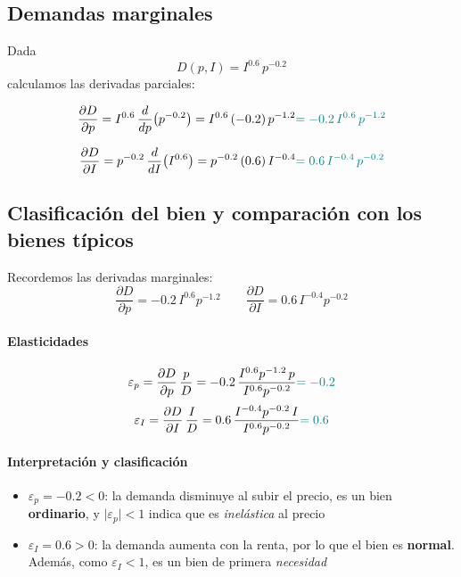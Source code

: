 \documentclass{article}
\begin{document}
\subsection*{Demandas marginales}

Dada
\[
D(p,I)=I^{0.6}\,p^{-0.2}
\]
calculamos las derivadas parciales:

\[
\frac{\partial D}{\partial p}
=I^{0.6}\,\frac{d}{dp}\bigl(p^{-0.2}\bigr)
=I^{0.6}\,(-0.2)\,p^{-1.2}
\color{teal}{= -0.2\,I^{0.6}\,p^{-1.2}}
\]

\[
\frac{\partial D}{\partial I}
=p^{-0.2}\,\frac{d}{dI}\bigl(I^{0.6}\bigr)
=p^{-0.2}\,(0.6)\,I^{-0.4}
\color{teal}{= 0.6\,I^{-0.4}\,p^{-0.2}}
\]

\subsection*{ Clasificación del bien y comparación con los bienes típicos}

Recordemos las derivadas marginales:
\[
\frac{\partial D}{\partial p}=-0.2\,I^{0.6}p^{-1.2}
\qquad
\frac{\partial D}{\partial I}=0.6\,I^{-0.4}p^{-0.2}
\]

\paragraph{Elasticidades}

\[
\varepsilon_{p}
=\frac{\partial D}{\partial p}\,\frac{p}{D}
=-0.2\,\frac{I^{0.6}p^{-1.2}\,p}{I^{0.6}p^{-0.2}}
\color{teal}{= -0.2}
\]
\[
\varepsilon_{I}
=\frac{\partial D}{\partial I}\,\frac{I}{D}
=0.6\,\frac{I^{-0.4}p^{-0.2}\,I}{I^{0.6}p^{-0.2}}
\color{teal}{= 0.6}
\]

\paragraph{Interpretación y clasificación}

\begin{itemize}
  \item \(\varepsilon_{p} = -0.2 < 0\): la demanda disminuye al subir el precio, es un bien \textbf{\color{teal} ordinario}, y \(\lvert\varepsilon_{p}\rvert<1\) {indica que es \emph{\color{teal}inelástica} al precio}
  \item \(\varepsilon_{I} = 0.6 > 0\): la demanda aumenta con la renta, {por lo que el bien es \textbf{ \color{teal}normal}}. Además, como \(\varepsilon_{I}<1\), {\color{teal}es un bien de primera \emph{necesidad}}
\end{itemize}
\end{document}

